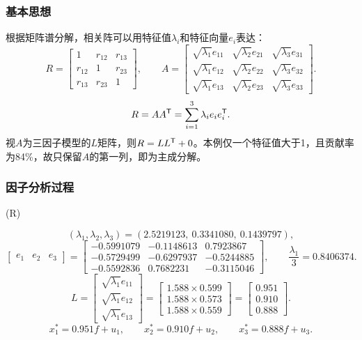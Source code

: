\subsubsection{基本思想}
根据矩阵谱分解，相关阵可以用特征值$\lambda_i$和特征向量$e_i$表达：
\[
R=\begin{bmatrix}1&r_{12}&r_{13}\\r_{12}&1&r_{23}\\r_{13}&r_{23}&1\end{bmatrix},\qquad
A=\begin{bmatrix}
\sqrt{\lambda_1}e_{11}&\sqrt{\lambda_2}e_{21}&\sqrt{\lambda_3}e_{31}\\
\sqrt{\lambda_1}e_{12}&\sqrt{\lambda_2}e_{22}&\sqrt{\lambda_3}e_{32}\\
\sqrt{\lambda_1}e_{13}&\sqrt{\lambda_2}e_{23}&\sqrt{\lambda_3}e_{33}
\end{bmatrix}.
\]
\begin{equation}
R=AA^{\mathsf T}=\sum_{i=1}^3\lambda_i e_i e_i^{\mathsf T}.
\end{equation}
视$A$为三因子模型的$L$矩阵，则$R=LL^{\mathsf T}+0$。本例仅一个特征值大于1，且贡献率为84\%，故只保留$A$的第一列，即为主成分解。
\subsubsection{因子分析过程}
\begin{code}
(R)
 \ROperator{/} 
\end{code}
\[
(\lambda_1,\lambda_2,\lambda_3)=(2.5219123,\ 0.3341080,\ 0.1439797),
\]
\[
\begin{bmatrix}e_1&e_2&e_3\end{bmatrix}=
\begin{bmatrix}
-0.5991079&-0.1148613&0.7923867\\
-0.5729499&-0.6297937&-0.5244885\\
-0.5592836&0.7682231&-0.3115046
\end{bmatrix},\qquad\frac{\lambda_1}{3}=0.8406374.
\]
\[
L=\begin{bmatrix}\sqrt{\lambda_1}e_{11}\\\sqrt{\lambda_1}e_{12}\\\sqrt{\lambda_1}e_{13}\end{bmatrix}
=\begin{bmatrix}1.588\times0.599\\1.588\times0.573\\1.588\times0.559\end{bmatrix}
=\begin{bmatrix}0.951\\0.910\\0.888\end{bmatrix}.
\]
\[
x_1^*=0.951f+u_1,\qquad x_2^*=0.910f+u_2,\qquad x_3^*=0.888f+u_3.
\]
